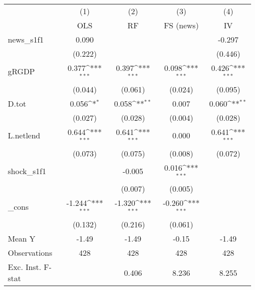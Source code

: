 {
\def\sym#1{\ifmmode^{#1}\else\(^{#1}\)\fi}
\begin{tabular}{l*{4}{c}}
\toprule
            &\multicolumn{1}{c}{(1)}&\multicolumn{1}{c}{(2)}&\multicolumn{1}{c}{(3)}&\multicolumn{1}{c}{(4)}\\
            &\multicolumn{1}{c}{OLS}&\multicolumn{1}{c}{RF}&\multicolumn{1}{c}{FS (news)}&\multicolumn{1}{c}{IV}\\
\midrule
news\_s1f1   &       0.090         &                     &                     &      -0.297         \\
            &     (0.222)         &                     &                     &     (0.446)         \\
\addlinespace
gRGDP       &       0.377\sym{***}&       0.397\sym{***}&       0.098\sym{***}&       0.426\sym{***}\\
            &     (0.044)         &     (0.061)         &     (0.024)         &     (0.095)         \\
\addlinespace
D.tot       &       0.056\sym{*}  &       0.058\sym{**} &       0.007         &       0.060\sym{**} \\
            &     (0.027)         &     (0.028)         &     (0.004)         &     (0.028)         \\
\addlinespace
L.netlend   &       0.644\sym{***}&       0.641\sym{***}&       0.000         &       0.641\sym{***}\\
            &     (0.073)         &     (0.075)         &     (0.008)         &     (0.072)         \\
\addlinespace
shock\_s1f1  &                     &      -0.005         &       0.016\sym{***}&                     \\
            &                     &     (0.007)         &     (0.005)         &                     \\
\addlinespace
\_cons      &      -1.244\sym{***}&      -1.320\sym{***}&      -0.260\sym{***}&                     \\
            &     (0.132)         &     (0.216)         &     (0.061)         &                     \\
\midrule
Mean Y      &       -1.49         &       -1.49         &       -0.15         &       -1.49         \\
Observations&         428         &         428         &         428         &         428         \\
Exc. Inst. F-stat&                     &       0.406         &       8.236         &       8.255         \\
\bottomrule
\end{tabular}
}
